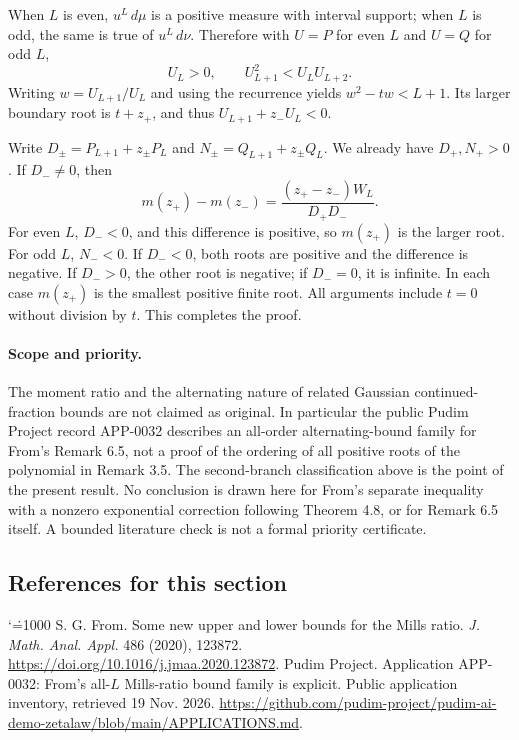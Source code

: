 \documentclass[11pt,a4paper]{article}
\makeatletter
\numberwithin{equation}{section}
\theoremstyle{definition}
\theoremstyle{remark}
\renewenvironment{thebibliography}[1]
 {\subsection*{References for this section}\small
  \list{\@biblabel{\@arabic\c@enumiv}}
       {\settowidth\labelwidth{\@biblabel{#1}}\leftmargin\labelwidth
        \advance\leftmargin\labelsep\@openbib@code
        \usecounter{enumiv}\let\p@enumiv\@empty
        \renewcommand\theenumiv{\@arabic\c@enumiv}}
  \sloppy\clubpenalty4000\widowpenalty4000\sfcode`\.=1000\relax}
 {\def\@noitemerr{\@latex@warning{Empty bibliography}}\endlist}
\makeatother
\begin{document}
When $L$ is even, $u^L\,d\mu$ is a positive measure with interval support; when $L$ is odd, the same is true of $u^L\,d\nu$. Therefore with $U=P$ for even $L$ and $U=Q$ for odd $L$,
\[
 U_L>0,\qquad U_{L+1}^2<U_LU_{L+2}.
\]
Writing $w=U_{L+1}/U_L$ and using the recurrence yields $w^2-tw<L+1$. Its larger boundary root is $t+z_+$, and thus $U_{L+1}+z_-U_L<0$.

Write $D_\pm=P_{L+1}+z_\pm P_L$ and $N_\pm=Q_{L+1}+z_\pm Q_L$. We already have $D_+,N_+>0$. If $D_-\ne0$, then
\[
 m(z_+)-m(z_-)=\frac{(z_+-z_-)W_L}{D_+D_-}.
\]
For even $L$, $D_-<0$, and this difference is positive, so $m(z_+)$ is the larger root. For odd $L$, $N_-<0$. If $D_-<0$, both roots are positive and the difference is negative. If $D_->0$, the other root is negative; if $D_-=0$, it is infinite. In each case $m(z_+)$ is the smallest positive finite root. All arguments include $t=0$ without division by $t$. This completes the proof.

\paragraph{Scope and priority.}
The moment ratio and the alternating nature of related Gaussian continued-fraction bounds are not claimed as original. In particular the public Pudim Project record APP-0032 \cite{r34showa:pudim} describes an all-order alternating-bound family for From's Remark 6.5, not a proof of the ordering of all positive roots of the polynomial in Remark 3.5. The second-branch classification above is the point of the present result. No conclusion is drawn here for From's separate inequality with a nonzero exponential correction following Theorem 4.8, or for Remark 6.5 itself. A bounded literature check is not a formal priority certificate.
\begin{thebibliography}{9}
 S. G. From. Some new upper and lower bounds for the Mills ratio. \emph{J. Math. Anal. Appl.} 486 (2020), 123872. \url{https://doi.org/10.1016/j.jmaa.2020.123872}.
 Pudim Project. Application APP-0032: From's all-$L$ Mills-ratio bound family is explicit. Public application inventory, retrieved 19 Nov. 2026. \url{https://github.com/pudim-project/pudim-ai-demo-zetalaw/blob/main/APPLICATIONS.md}.
\end{thebibliography}

\par\endgroup

\begingroup
\end{document}
